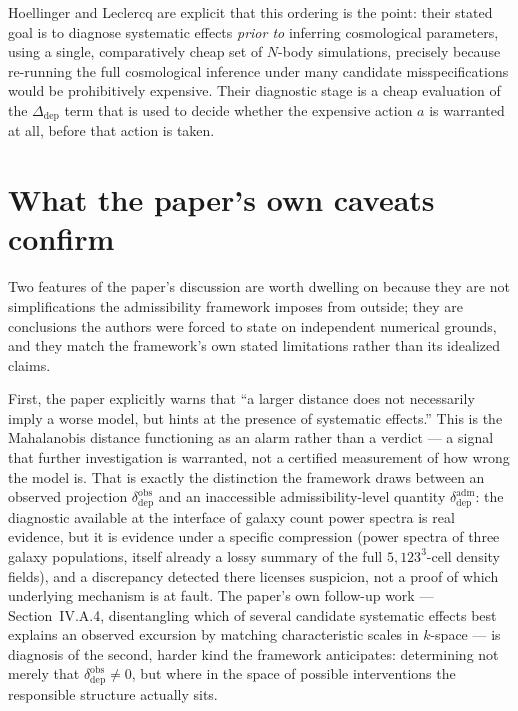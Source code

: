 \documentclass[11pt]{article}
\newcommand{\Ddep}{\Delta_{\mathrm{dep}}}
\begin{document}
Hoellinger and Leclercq are explicit that this ordering is the point: their stated goal is to diagnose systematic effects \emph{prior to} inferring cosmological parameters, using a single, comparatively cheap set of $N$-body simulations, precisely because re-running the full cosmological inference under many candidate misspecifications would be prohibitively expensive. Their diagnostic stage is a cheap evaluation of the $\Ddep$ term that is used to decide whether the expensive action $a$ is warranted at all, before that action is taken.

\section{What the paper's own caveats confirm}

Two features of the paper's discussion are worth dwelling on because they are not simplifications the admissibility framework imposes from outside; they are conclusions the authors were forced to state on independent numerical grounds, and they match the framework's own stated limitations rather than its idealized claims.

First, the paper explicitly warns that ``a larger distance does not necessarily imply a worse model, but hints at the presence of systematic effects.'' This is the Mahalanobis distance functioning as an alarm rather than a verdict --- a signal that further investigation is warranted, not a certified measurement of how wrong the model is. That is exactly the distinction the framework draws between an observed projection $\delta_{\mathrm{dep}}^{\mathrm{obs}}$ and an inaccessible admissibility-level quantity $\delta_{\mathrm{dep}}^{\mathrm{adm}}$: the diagnostic available at the interface of galaxy count power spectra is real evidence, but it is evidence under a specific compression (power spectra of three galaxy populations, itself already a lossy summary of the full $5{,}123^3$-cell density fields), and a discrepancy detected there licenses suspicion, not a proof of which underlying mechanism is at fault. The paper's own follow-up work --- Section~IV.A.4, disentangling which of several candidate systematic effects best explains an observed excursion by matching characteristic scales in $k$-space --- is diagnosis of the second, harder kind the framework anticipates: determining not merely that $\delta_{\mathrm{dep}}^{\mathrm{obs}} \neq 0$, but where in the space of possible interventions the responsible structure actually sits.
\end{document}
